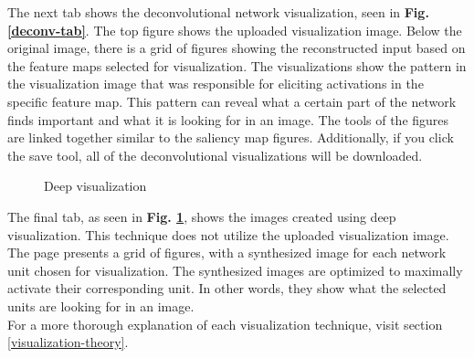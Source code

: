 \noindent The next tab shows the deconvolutional network visualization, seen in \textbf{Fig. \ref{deconv-tab}}. The top figure shows the uploaded visualization image. Below the original image, there is a grid of figures showing the reconstructed input based on the feature maps selected for visualization. The visualizations show the pattern in the visualization image that was responsible for eliciting activations in the specific feature map. This pattern can reveal what a certain part of the network finds important and what it is looking for in an image. The tools of the figures are linked together similar to the saliency map figures. Additionally, if you click the save tool, all of the deconvolutional visualizations will be downloaded.\\

\begin{figure}[!h]
    \centering
        \caption{Deep visualization}
        \label{deepvis-tab}
\end{figure}

\noindent The final tab, as seen in \textbf{Fig. \ref{deepvis-tab}}, shows the images created using deep visualization. This technique does not utilize the uploaded visualization image. The page presents a grid of figures, with a synthesized image for each network unit chosen for visualization. The synthesized images are optimized to maximally activate their corresponding unit. In other words, they show what the selected units are looking for in an image. \\

\noindent For a more thorough explanation of each visualization technique, visit section \ref{visualization-theory}.

\cleardoublepage